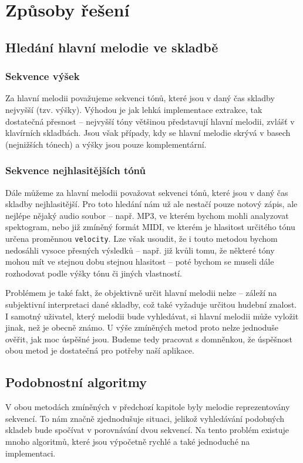 \section{Způsoby řešení}

\subsection{Hledání hlavní melodie ve skladbě}

\subsubsection*{Sekvence výšek}
Za hlavní melodii považujeme sekvenci tónů, které jsou v daný čas skladby nejvyšší (tzv. výšky). Výhodou je jak lehká implementace extrakce, tak dostatečná přesnost -- nejvyšší tóny většinou představují hlavní melodii, zvlášť v klavírních skladbách. Jsou však případy, kdy se hlavní melodie skrývá v basech (nejnižších tónech) a výšky jsou pouze komplementární. 

\subsubsection*{Sekvence nejhlasitějších tónů}
Dále můžeme za hlavní melodii považovat sekvenci tónů, které jsou v daný čas skladby nejhlasitější. Pro toto hledání nám už ale nestačí pouze notový zápis, ale nejlépe nějaký audio soubor -- např. MP3, ve kterém bychom mohli analyzovat spektogram, nebo již zmíněný formát MIDI, ve kterém je hlasitost určitého tónu určena proměnnou \lstinline{velocity}. Lze však usoudit, že i touto metodou bychom nedosáhli vysoce přesných výsledků -- např. již kvůli tomu, že některé tóny mohou mít ve stejnou dobu stejnou hlasitost -- poté bychom se museli dále rozhodovat podle výšky tónu či jiných vlastností.

Problémem je také fakt, že objektivně určit hlavní melodii nelze -- záleží na subjektivní interpretaci dané skladby, což také vyžaduje určitou hudební znalost. I samotný uživatel, který melodii bude vyhledávat, si hlavní melodii může vyložit jinak, než je obecně známo. U výše zmíněných metod proto nelze jednoduše ověřit, jak moc úspěšné jsou. Budeme tedy pracovat s domněnkou, že úspěšnost obou metod je dostatečná pro potřeby naší aplikace.

\subsection{Podobnostní algoritmy}
V obou metodách zmíněných v předchozí kapitole byly melodie reprezentovány sekvencí. To nám značně zjednodušuje situaci, jelikož vyhledávání podobných skladeb bude spočívat v porovnávání dvou sekvencí. Na tento problém existuje mnoho algoritmů, které jsou výpočetně rychlé a také jednoduché na implementaci.

